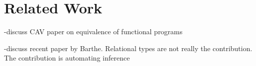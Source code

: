 \section{Related Work}
\label{sec:related-work}

\cite{jhala11}

-discuss CAV paper on equivalence of functional programs

-discuss recent paper by Barthe. Relational types are not really the
 contribution. The contribution is automating inference


